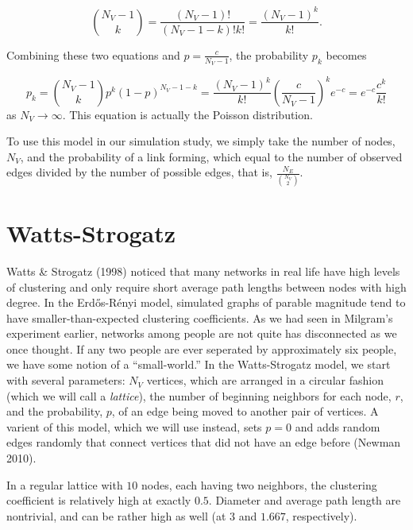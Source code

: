 \documentclass[12pt,twoside]{amherstthesis}
\begin{document}
  \[{N_{V} - 1 \choose k} = \frac {(N_{V} - 1)!} {(N_{V} - 1 - k)!k!} = \frac {(N_{V} - 1)^{k}} {k!}.\]
  
  Combining these two equations and \(p = \frac {c} {N_{V} - 1}\), the
  probability \(p_{k}\) becomes
  
  \[p_{k} = {N_{V} -1 \choose k}p^{k}(1 - p)^{N_{V} - 1 - k} = \frac {(N_{V} - 1)^{k}} {k!}\left(\frac {c} {N_{V} - 1}\right)^{k}e^{-c} = e^{-c} \frac{c^{k}} {k!}\]
  as \(N_{V} \to \infty\). This equation is actually the Poisson
  distribution.
  
  To use this model in our simulation study, we simply take the number of
  nodes, \(N_{V}\), and the probability of a link forming, which equal to
  the number of observed edges divided by the number of possible edges,
  that is, \(\frac{N_{E}} {{N_{V} \choose 2}}\).
  
  \section{Watts-Strogatz}\label{watts-strogatz}
  
  Watts \& Strogatz (1998) noticed that many networks in real life have
  high levels of clustering and only require short average path lengths
  between nodes with high degree. In the Erdős-Rényi model, simulated
  graphs of parable magnitude tend to have smaller-than-expected
  clustering coefficients. As we had seen in Milgram's experiment earlier,
  networks among people are not quite has disconnected as we once thought.
  If any two people are ever seperated by approximately six people, we
  have some notion of a ``small-world.'' In the Watts-Strogatz model, we
  start with several parameters: \(N_V\) vertices, which are arranged in a
  circular fashion (which we will call a \emph{lattice}), the number of
  beginning neighbors for each node, \(r\), and the probability, \(p\), of
  an edge being moved to another pair of vertices. A varient of this
  model, which we will use instead, sets \(p = 0\) and adds random edges
  randomly that connect vertices that did not have an edge before (Newman
  2010).
  
  In a regular lattice with \(10\) nodes, each having two neighbors, the
  clustering coefficient is relatively high at exactly \(0.5\). Diameter
  and average path length are nontrivial, and can be rather high as well
  (at \(3\) and \(1.667\), respectively).
  
\end{document}
